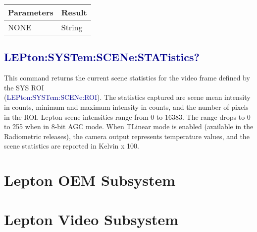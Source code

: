 \documentclass[10pt,a4paper]{article}
\begin{document}
\begin{table}[h]
    \centering
    \begin{tabularx}{\textwidth}{|X|X|}
        \hline
        \rowcolor{gray!30} 
        Parameters & Result \\
        \hline
        NONE &  String \\
        \hline
    \end{tabularx}
\end{table}


\subsection*{\textcolor{darkblue}{LEPton:SYSTem:SCENe:STATistics?}}

\vspace{12pt}

This command returns the current scene statistics for the video frame defined by the SYS ROI \\
(\textcolor{darkblue}{LEPton:SYSTem:SCENe:ROI}).
The statistics captured are scene mean intensity in counts, minimum and maximum intensity in counts, and the
number of pixels in the ROI. Lepton scene intensities range from 0 to 16383. The range drops to 0 to 255 when in
8-bit AGC mode. When TLinear mode is enabled (available in the Radiometric releases),
the camera output represents temperature values, and the scene statistics are reported in Kelvin x 100.

\newpage
\section*{\label{sec:LeptonOem}Lepton OEM Subsystem}
\section*{\label{sec:LeptonVideo}Lepton Video Subsystem}
\end{document}
